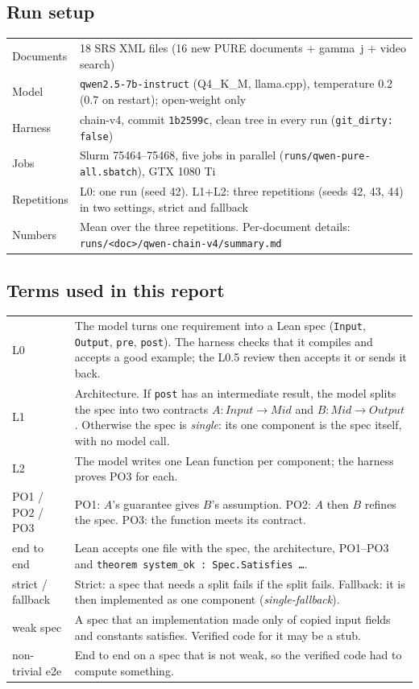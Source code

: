 \documentclass[10pt,a4paper]{article}
\newcommand{\code}[1]{\texttt{\small #1}}
\begin{document}
\subsection{Run setup}
\begin{tabularx}{\linewidth}{@{}lX@{}}
\toprule
Documents   & 18 SRS XML files (16 new PURE documents + gamma~j + video search) \\
Model       & \code{qwen2.5-7b-instruct} (Q4\_K\_M, llama.cpp), temperature 0.2 (0.7 on restart); open-weight only \\
Harness     & chain-v4, commit \code{1b2599c}, clean tree in every run (\code{git\_dirty: false}) \\
Jobs        & Slurm 75464--75468, five jobs in parallel (\code{runs/qwen-pure-all.sbatch}), GTX 1080 Ti \\
Repetitions & L0: one run (seed 42). L1+L2: three repetitions (seeds 42, 43, 44) in two settings, strict and fallback \\
Numbers     & Mean over the three repetitions. Per-document details: \code{runs/<doc>/qwen-chain-v4/summary.md} \\
\bottomrule
\end{tabularx}

\subsection{Terms used in this report}
\begin{tabularx}{\linewidth}{@{}lX@{}}
\toprule
L0 & The model turns one requirement into a Lean spec (\code{Input}, \code{Output}, \code{pre}, \code{post}). The harness checks
     that it compiles and accepts a good example; the L0.5 review then accepts it or sends it back. \\
L1 & Architecture. If \code{post} has an intermediate result, the model splits the spec into two contracts
     $A : \mathit{Input} \to \mathit{Mid}$ and $B : \mathit{Mid} \to \mathit{Output}$. Otherwise the spec is \emph{single}:
     its one component is the spec itself, with no model call. \\
L2 & The model writes one Lean function per component; the harness proves PO3 for each. \\
PO1 / PO2 / PO3 & PO1: $A$'s guarantee gives $B$'s assumption. PO2: $A$ then $B$ refines the spec. PO3: the function meets its contract. \\
end to end & Lean accepts one file with the spec, the architecture, PO1--PO3 and \code{theorem system\_ok : Spec.Satisfies \dots}. \\
strict / fallback & Strict: a spec that needs a split fails if the split fails. Fallback: it is then implemented as one
     component (\emph{single-fallback}). \\
weak spec & A spec that an implementation made only of copied input fields and constants satisfies. Verified code for it may be a stub. \\
non-trivial e2e & End to end on a spec that is not weak, so the verified code had to compute something. \\
\bottomrule
\end{tabularx}
\end{document}
